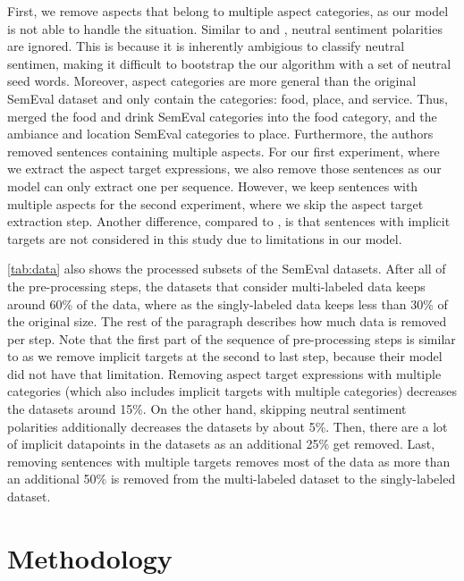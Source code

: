 \documentclass[american, oneside]{ecsgdp}
\begin{document}
First, we remove aspects that belong to multiple aspect categories, as our model is not able to handle the situation. Similar to \textcite{Huang2020JASen} and \textcite{Kumar2021CASC}, neutral sentiment polarities are ignored. This is because it is inherently ambigious to classify neutral sentimen, making it difficult to bootstrap the our algorithm with a set of neutral seed words. Moreover, aspect categories are more general than the original SemEval dataset and only contain the categories: food, place, and service. Thus, \textcite{Kumar2021CASC} merged the food and drink SemEval categories into the food category, and the ambiance and location SemEval categories to place. Furthermore, the authors removed sentences containing multiple aspects. For our first experiment, where we extract the aspect target expressions, we also remove those sentences as our model can only extract one per sequence. However, we keep sentences with multiple aspects for the second experiment, where we skip the aspect target extraction step. Another difference, compared to \textcite{Kumar2021CASC}, is that sentences with implicit targets are not considered in this study due to limitations in our model.

\cref{tab:data} also shows the processed subsets of the SemEval datasets. After all of the pre-processing steps, the datasets that consider multi-labeled data keeps around 60\% of the data, where as the singly-labeled data keeps less than 30\% of the original size. The rest of the paragraph describes how much data is removed per step. Note that the first part of the sequence of pre-processing steps is similar to \textcite{Kumar2021CASC} as we remove implicit targets at the second to last step, because their model did not have that limitation. Removing aspect target expressions with multiple categories (which also includes implicit targets with multiple categories) decreases the datasets around 15\%. On the other hand, skipping neutral sentiment polarities additionally decreases the datasets by about 5\%. Then, there are a lot of implicit datapoints in the datasets as an additional 25\% get removed. Last, removing sentences with multiple targets removes most of the data as more than an additional 50\% is removed from the multi-labeled dataset to the singly-labeled dataset.

\chapter{Methodology} \label{chap:methodology}
\end{document}
